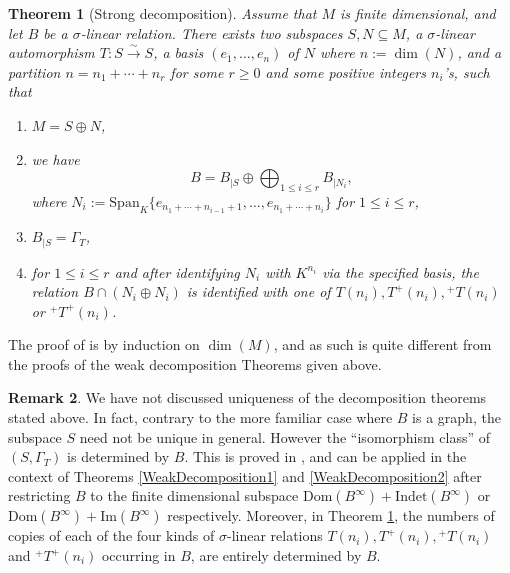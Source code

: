 \documentclass[12pt]{amsart}
\newtheorem{theorem}{Theorem}[section]
\theoremstyle{definition}
\newtheorem{remark}[theorem]{Remark}
\newcommand{\<}{\langle}   %
\renewcommand{\>}{\rangle} %
\begin{document}

\begin{theorem}[Strong decomposition]\label{StrongDecomposition}
    Assume that $M$ is finite dimensional, and let $B$ be a $\sigma$-linear relation. There exists two subspaces $S,N \subseteq  M$, a $\sigma$-linear automorphism $T:S \xrightarrow{\sim} S$, a basis $(e_1,\ldots ,e_n)$ of $N$ where $n := \dim(N)$, and a partition $n = n_1 + \cdots + n_r$ for some $r\geq 0$ and some positive integers $n_i$'s, such that
    \begin{enumerate}
        \item $M = S \oplus N$,
        \item we have 
        \begin{equation*}
            B = B_{|S} \oplus \bigoplus_{1\leq i \leq r} B_{|N_i},
        \end{equation*}
        where $N_i := \mathrm{Span}_K\{{e_{n_1+\cdots+n_{i-1}+1}, \ldots , e_{n_1+\cdots+n_{i}}}\}$ for $1\leq i \leq r$, 
        \item $B_{|S} = \Gamma_T$,
        \item for $1 \leq i \leq r$ and after identifying $N_i$ with $K^{n_{i}}$ via the specified basis, the relation $B\cap (N_i\oplus N_i)$ is identified with one of $T(n_i), T^+(n_i), {}^+T(n_i)$ or ${}^+T^+(n_i)$.
    \end{enumerate}
\end{theorem}

The proof of \cite{towber:1971} is by induction on $\dim(M)$, and as such is quite different from the proofs of the weak decomposition Theorems given above. 

\begin{remark}
    We have not discussed uniqueness of the decomposition theorems stated above. In fact, contrary to the more familiar case where $B$ is a graph, the subspace $S$ need not be unique in general. However the ``isomorphism class'' of $(S,\Gamma_T)$ is determined by $B$. This is proved in \cite{towber:1971}, and can be applied in the context of Theorems \ref{WeakDecomposition1} and \ref{WeakDecomposition2} after restricting $B$ to the finite dimensional subspace $\mathrm{Dom}(B^{\infty}) + \mathrm{Indet}(B^{\infty})$ or $\mathrm{Dom}(B^{\infty})+\mathrm{Im}(B^{\infty})$ respectively. Moreover, in Theorem \ref{StrongDecomposition}, the numbers of copies of each of the four kinds of $\sigma$-linear relations $T(n_i), T^+(n_i), {}^+T(n_i)$ and ${}^+T^+(n_i)$ occurring in $B$, are entirely determined by $B$.
\end{remark}
\end{document}
